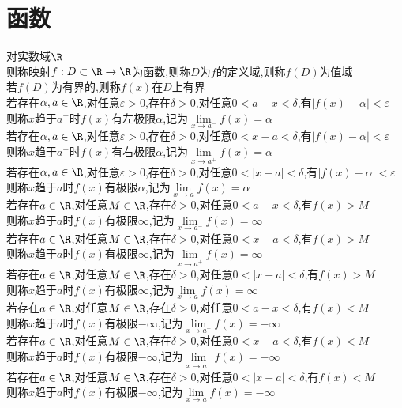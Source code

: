 \chapter{函数}

\begin{dingyi}
对实数域$\R$\\
则称映射$f:D\subset \R\to \R$为函数,则称$D$为$f$的定义域,则称$f(D)$为值域\\
若$f(D)$为有界的,则称$f(x)$在$D$上有界\\
若存在$\alpha,a\in \R$,对任意$\varepsilon>0$,存在$\delta>0$,对任意$0<a-x<\delta$,有$|f(x)-\alpha|<\varepsilon$\\
则称$x$趋于$a^{-}$时$f(x)$有左极限$\alpha$,记为$\lim\limits_{x\to a^{-}}f(x)=\alpha$\\
若存在$\alpha,a\in \R$,对任意$\varepsilon>0$,存在$\delta>0$,对任意$0<x-a<\delta$,有$|f(x)-\alpha|<\varepsilon$\\
则称$x$趋于$a^{+}$时$f(x)$有右极限$\alpha$,记为$\lim\limits_{x\to a^{+}}f(x)=\alpha$\\
若存在$\alpha,a\in \R$,对任意$\varepsilon>0$,存在$\delta>0$,对任意$0<|x-a|<\delta$,有$|f(x)-\alpha|<\varepsilon$\\
则称$x$趋于$a$时$f(x)$有极限$\alpha$,记为$\lim\limits_{x\to a}f(x)=\alpha$\\
若存在$a\in \R$,对任意$M\in \R$,存在$\delta>0$,对任意$0<a-x<\delta$,有$f(x)>M$\\
则称$x$趋于$a$时$f(x)$有极限$\infty$,记为$\lim\limits_{x\to a^{-}}f(x)=\infty$\\
若存在$a\in \R$,对任意$M\in \R$,存在$\delta>0$,对任意$0<x-a<\delta$,有$f(x)>M$\\
则称$x$趋于$a$时$f(x)$有极限$\infty$,记为$\lim\limits_{x\to a^{+}}f(x)=\infty$\\
若存在$a\in \R$,对任意$M\in \R$,存在$\delta>0$,对任意$0<|x-a|<\delta$,有$f(x)>M$\\
则称$x$趋于$a$时$f(x)$有极限$\infty$,记为$\lim\limits_{x\to a}f(x)=\infty$\\
若存在$a\in \R$,对任意$M\in \R$,存在$\delta>0$,对任意$0<a-x<\delta$,有$f(x)<M$\\
则称$x$趋于$a$时$f(x)$有极限$-\infty$,记为$\lim\limits_{x\to a^{-}}f(x)=-\infty$\\
若存在$a\in \R$,对任意$M\in \R$,存在$\delta>0$,对任意$0<x-a<\delta$,有$f(x)<M$\\
则称$x$趋于$a$时$f(x)$有极限$-\infty$,记为$\lim\limits_{x\to a^{+}}f(x)=-\infty$\\
若存在$a\in \R$,对任意$M\in \R$,存在$\delta>0$,对任意$0<|x-a|<\delta$,有$f(x)<M$\\
则称$x$趋于$a$时$f(x)$有极限$-\infty$,记为$\lim\limits_{x\to a}f(x)=-\infty$
\end{dingyi}


